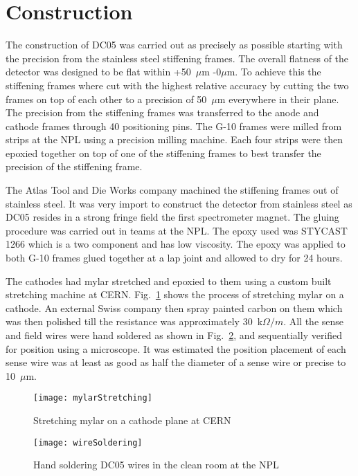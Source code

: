\section{Construction}

The construction of DC05 was carried out as precisely as possible starting with
the precision from the stainless steel stiffening frames.  The overall flatness
of the detector was designed to be flat within +50~$\mu$m -0$\mu$m.  To achieve
this the stiffening frames where cut with the highest relative accuracy by
cutting the two frames on top of each other to a precision of 50~$\mu$m
everywhere in their plane.  The precision from the stiffening frames was
transferred to the anode and cathode frames through 40 positioning pins.  The
G-10 frames were milled from strips at the NPL using a precision milling
machine.  Each four strips were then epoxied together on top of one of the
stiffening frames to best transfer the precision of the stiffening frame.

The Atlas Tool and Die Works company machined the stiffening frames out of
stainless steel.  It was very import to construct the detector from stainless
steel as DC05 resides in a strong fringe field the first spectrometer magnet.
The gluing procedure was carried out in teams at the NPL.  The epoxy used was
STYCAST 1266 which is a two component and has low viscosity.  The epoxy was
applied to both G-10 frames glued together at a lap joint and allowed to dry for
24 hours.

The cathodes had mylar stretched and epoxied to them using a custom built
stretching machine at CERN.  Fig.~\ref{fig::mylarStretching} shows the process
of stretching mylar on a cathode.  An external Swiss company then spray painted
carbon on them which was then polished till the resistance was approximately
30~k$\Omega /m$.  All the sense and field wires were hand soldered as shown in
Fig.~\ref{fig::wireSoldering}, and sequentially verified for position using a
microscope.  It was estimated the position placement of each sense wire was at
least as good as half the diameter of a sense wire or precise to 10~$\mu$m.

\begin{figure}[h!t]
  \centering \texttt{[image: mylarStretching]}
  \caption{Stretching mylar on a cathode plane at CERN}
  \label{fig::mylarStretching}
\end{figure}

\begin{figure}[h!t]
  \centering \texttt{[image: wireSoldering]}
  \caption{Hand soldering DC05 wires in the clean room at the NPL}
  \label{fig::wireSoldering}
\end{figure}

